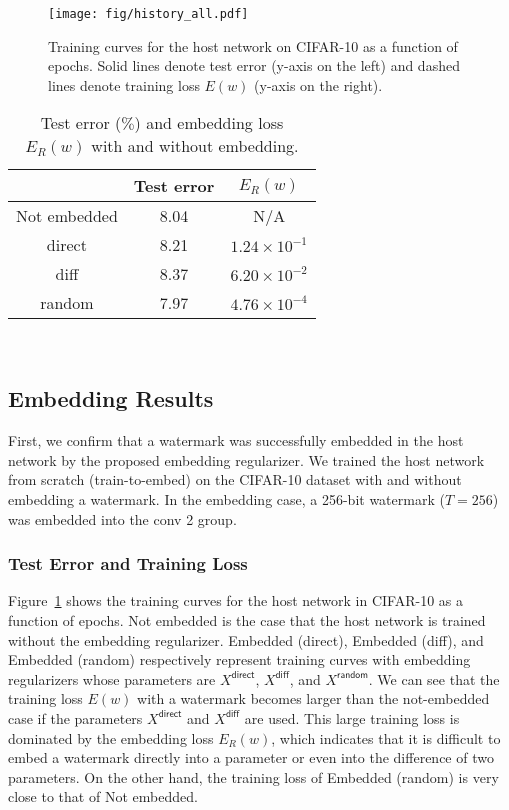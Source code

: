\documentclass[10pt,twocolumn,letterpaper]{article}
\begin{document}
\begin{figure}[tb]
	\centering
	\texttt{[image: fig/history\_all.pdf]}
	\caption{Training curves for the host network on CIFAR-10 as a function of epochs.
	Solid lines denote test error (y-axis on the left) and dashed lines denote training loss $E(w)$ (y-axis on the right).}
	\label{fig:history}
\end{figure}


\begin{table}[tb]
	\centering
	\caption{Test error ($\%$) and embedding loss $E_R (w)$ with and without embedding.}
	\label{tab:embed_result}
\begin{tabular}{c|cc} \hline
				& Test error	& $E_R (w)$	\\ \hline
Not embedded	& 8.04				& N/A				\\
direct	& 8.21			& $1.24{\times}10^{-1}$	\\
diff	& 8.37			& $6.20{\times}10^{-2}$	\\
random	& 7.97			& $4.76{\times}10^{-4}$	\\ \hline
	\end{tabular} \\
\end{table}


\subsection{Embedding Results}
First, we confirm that a watermark was successfully embedded in the host network by the proposed embedding regularizer.
We trained the host network from scratch (\textsf{train-to-embed}) on the CIFAR-10 dataset with and without embedding a watermark.
In the embedding case, a 256-bit watermark ($T=256$) was embedded into the \textsf{conv 2} group.

\subsubsection{Test Error and Training Loss}
Figure~\ref{fig:history} shows the training curves for the host network in CIFAR-10 as a function of epochs.
\textsf{Not embedded} is the case that the host network is trained without the embedding regularizer.
\textsf{Embedded (direct)}, \textsf{Embedded (diff)}, and \textsf{Embedded (random)} respectively represent training curves with embedding regularizers whose parameters are $X^{\textsf{direct}}$, $X^{\textsf{diff}}$, and $X^{\textsf{random}}$.
We can see that the training loss $E(w)$ with a watermark becomes larger than the not-embedded case if the parameters $X^{\textsf{direct}}$ and $X^{\textsf{diff}}$ are used.
This large training loss is dominated by the embedding loss $E_R (w)$, which indicates that it is difficult to embed a watermark directly into a parameter or even into the difference of two parameters.
On the other hand, the training loss of \textsf{Embedded (random)} is very close to that of \textsf{Not embedded}.
\end{document}
